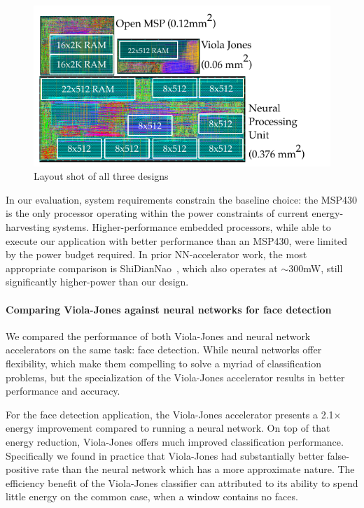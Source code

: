 \begin{figure}
\centering
    \begin{center}
      \includegraphics[width=1.2\textwidth]{nsp-figs/layout.pdf}
    \end{center}
    \caption{Layout shot of all three designs}
    \label{fig:layout_shot}
\end{figure}


In our evaluation, system requirements constrain the baseline choice: the MSP430 is the only processor operating within the power constraints of current energy-harvesting systems.
Higher-performance embedded processors, while able to execute our application with better performance than an MSP430, were limited by the power budget required.
In prior NN-accelerator work, the most appropriate comparison is ShiDianNao~\cite{shidiannao}, which also operates at $ \sim$300mW, still significantly higher-power than our design.

\paragraph{Comparing Viola-Jones against neural networks for face detection}
We compared the performance of both Viola-Jones and neural network accelerators
on the same task: face detection. While neural networks offer flexibility,
which make them compelling to solve a myriad of classification problems, but the
specialization of the Viola-Jones accelerator results in better performance and
accuracy.

For the face detection application, the Viola-Jones accelerator presents
a 2.1$\times$ energy improvement compared to running a neural network. On top of that energy reduction, Viola-Jones offers much improved classification performance.
Specifically we found in practice that Viola-Jones had substantially better
false-positive rate than the neural network which has a more approximate nature.
The efficiency benefit of the Viola-Jones classifier
can attributed to its ability to spend little energy on the common case, when a
window contains no faces.

